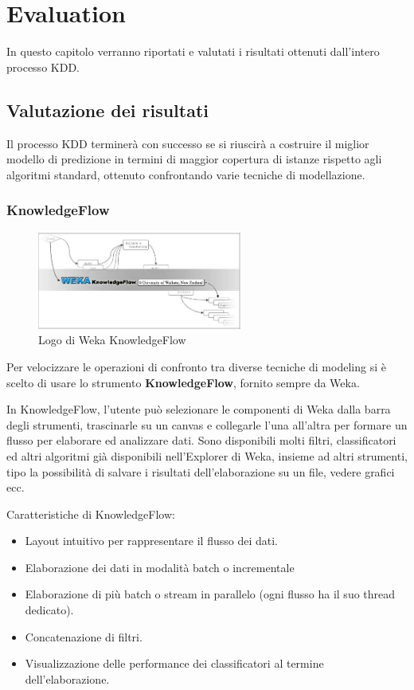 \chapter{Evaluation}
In questo capitolo verranno riportati e valutati i risultati ottenuti dall’intero processo KDD.

\section{Valutazione dei risultati}

Il processo KDD terminerà con successo se si riuscirà a costruire il miglior modello di predizione in termini di maggior copertura di istanze rispetto agli algoritmi standard, ottenuto confrontando varie tecniche di modellazione.

\subsection{KnowledgeFlow}

\begin{figure}[hbtp!]
	\centering
	\includegraphics[width=0.6\textwidth]{./images/kf}
  	\caption{Logo di Weka KnowledgeFlow}  
\end{figure}

Per velocizzare le operazioni di confronto tra diverse tecniche di modeling si è scelto di usare lo strumento \textbf{KnowledgeFlow}, fornito sempre da Weka.

In KnowledgeFlow, l'utente può selezionare le componenti di Weka dalla barra degli strumenti, trascinarle su un canvas e collegarle l'una all'altra per formare un flusso per elaborare ed analizzare dati. Sono disponibili molti filtri, classificatori ed altri algoritmi già disponibili nell'Explorer di Weka, insieme ad altri strumenti, tipo la possibilità di salvare i risultati dell'elaborazione su un file, vedere grafici ecc.
 

Caratteristiche di KnowledgeFlow:
\begin{itemize}
	\item Layout intuitivo per rappresentare il flusso dei dati.
	\item Elaborazione dei dati in modalità batch o incrementale
    \item Elaborazione di più batch o stream in parallelo (ogni flusso ha il suo thread dedicato).
    \item Concatenazione di filtri.
    \item Visualizzazione delle performance dei classificatori al termine dell'elaborazione.
\end{itemize}

